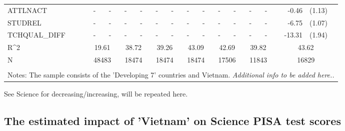 \documentclass[12pt]{article}%
\begin{document}
\begin{table}[H]
\begin{tabular}{lrlrlrlrlrlrlrl}
			ATTLNACT & \multicolumn{1}{c}{-} & \multicolumn{1}{c}{-} & \multicolumn{1}{c}{-} & \multicolumn{1}{c}{-} & \multicolumn{1}{c}{-} & \multicolumn{1}{c}{-} & \multicolumn{1}{c}{-} & \multicolumn{1}{c}{-} & \multicolumn{1}{c}{-} & \multicolumn{1}{c}{-} & \multicolumn{1}{c}{-} & \multicolumn{1}{c}{-} & -0.46 & (1.13) \\[0.2em]
			STUDREL & \multicolumn{1}{c}{-} & \multicolumn{1}{c}{-} & \multicolumn{1}{c}{-} & \multicolumn{1}{c}{-} & \multicolumn{1}{c}{-} & \multicolumn{1}{c}{-} & \multicolumn{1}{c}{-} & \multicolumn{1}{c}{-} & \multicolumn{1}{c}{-} & \multicolumn{1}{c}{-} & \multicolumn{1}{c}{-} & \multicolumn{1}{c}{-} & -6.75 & (1.07) \\[0.2em]
			TCHQUAL\_DIFF & \multicolumn{1}{c}{-} & \multicolumn{1}{c}{-} & \multicolumn{1}{c}{-} & \multicolumn{1}{c}{-} & \multicolumn{1}{c}{-} & \multicolumn{1}{c}{-} & \multicolumn{1}{c}{-} & \multicolumn{1}{c}{-} & \multicolumn{1}{c}{-} & \multicolumn{1}{c}{-} & \multicolumn{1}{c}{-} & \multicolumn{1}{c}{-} & -13.31 & (1.94) \\[0.2em]
			
			R^{2} & \multicolumn{2}{c}{19.61} & \multicolumn{2}{c}{38.72} & \multicolumn{2}{c}{39.26} & \multicolumn{2}{c}{43.09} & \multicolumn{2}{c}{42.69} & \multicolumn{2}{c}{39.82} & \multicolumn{2}{c}{43.62} \\
			N     & \multicolumn{2}{c}{48483} & \multicolumn{2}{c}{18474} & \multicolumn{2}{c}{18474} & \multicolumn{2}{c}{18474} & \multicolumn{2}{c}{17506} & \multicolumn{2}{c}{11843} & \multicolumn{2}{c}{16829} \\
			
			\bottomrule
			
			\\
			\multicolumn{15}{l}{Notes: The sample consists of the 'Developing 7' countries and Vietnam. \textit{Additional info to be added here..}}\\
		\end{tabular}%
		\label{tab:addlabel}%
	\end{table}%
	
See Science for decreasing/increasing, will be repeated here.

\subsection{The estimated impact of 'Vietnam' on Science PISA test scores}
\end{document}
